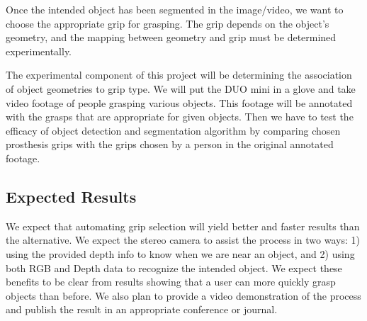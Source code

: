 \documentclass[12pt]{article}
\begin{document}
Once the intended object has been segmented in the image/video, we want to
choose the appropriate grip for grasping. The grip depends on the object’s
geometry, and the mapping between geometry and grip must be determined
experimentally. \newline

The experimental component of this project will be determining the association
of object geometries to grip type. We will put the DUO mini in a glove and take
video footage of people grasping various objects. This footage will be annotated
with the grasps that are appropriate for given objects. Then we have to test the
efficacy of object detection and segmentation algorithm by comparing chosen
prosthesis grips with the grips chosen by a person in the original annotated
footage. \newline

\subsection*{Expected Results}
We expect that automating grip selection will yield better and faster results
than the alternative. We expect the stereo camera to assist the process in two
ways: 1) using the provided depth info to know when we are near an object, and
2) using both RGB and Depth data to recognize the intended object. We expect
these benefits to be clear from results showing that a user can more quickly
grasp objects than before. We also plan to provide a video demonstration of the
process and publish the result in an appropriate conference or journal.
\end{document}
